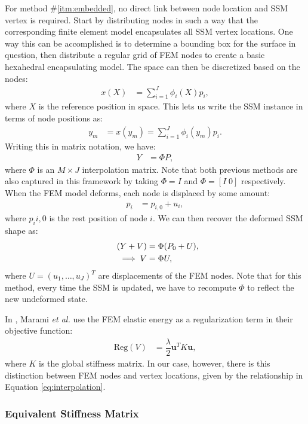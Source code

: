 \documentclass[10pt]{article}
\newcommand{\trans}[1]{#1^{T}}
\newcommand{\uvec}{\bm{u}}
\begin{document}
For method \#\ref{itm:embedded}, no direct link between node location and SSM vertex is required.  Start by distributing nodes in such a way
that the corresponding finite element model encapsulates all SSM vertex locations.  One way this can be accomplished is to determine a bounding
box for the surface in question, then distribute a regular grid of FEM nodes to create a basic hexahedral encapsulating model.  The space
can then be discretized based on the nodes:
\begin{align}
  x(X) & = \sum_{i=1}^J \phi_i(X)p_i,
\end{align}
where $X$ is the reference position in space.  This lets us write the SSM instance in terms of node positions as:
\begin{align}
  y_m & = x(y_m) = \sum_{i=1}^J \phi_i(y_m)p_i.
\end{align}
Writing this in matrix notation, we have:
\begin{align}
 Y & = \Phi P, \label{eq:interpolation}
\end{align}
where $\Phi$ is an $M\times J$ interpolation matrix.  Note that both previous methods are also captured
in this framework by taking $\Phi=I$ and $\Phi=[I\;0]$ respectively.  When the FEM model deforms, each node is displaced by
some amount:
\begin{align}
  p_i & = p_{i,0} + u_i,
\end{align}
where $p_i{i,0}$ is the rest position of node $i$.  We can then recover the deformed SSM shape as:
\begin{align}
  (Y+V) & = \Phi(P_0+U), \notag \\
  \quad \implies V & = \Phi U, \label{eq:uV}
\end{align}
where $U=(u_1,\ldots,u_J)^T$ are displacements of the FEM nodes.  Note that for this method, every time the SSM is updated,
we have to recompute $\Phi$ to reflect the new undeformed state.

In \cite{marami:2011:femreg}, Marami \textit{et al.} use the FEM elastic energy as a regularization term in their
objective function:
\begin{align}
   \mathrm{Reg}(V) & = \dfrac{\lambda}{2}\trans{\uvec}K\uvec,
\end{align}
where $K$ is the global stiffness matrix.  In our case, however, there is this distinction between FEM nodes and vertex locations, 
given by the relationship in Equation \eqref{eq:interpolation}.

\subsubsection{Equivalent Stiffness Matrix}
\end{document}
